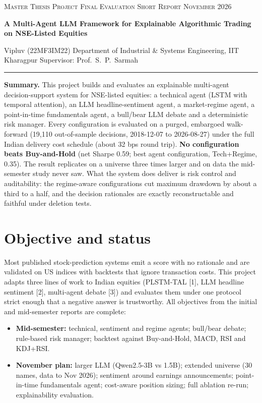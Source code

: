 \documentclass[10pt,a4paper]{article}
\begin{document}
{\small\textsc{Master Thesis Project \textperiodcentered{} Final Evaluation \textperiodcentered{} Short Report \textperiodcentered{} November 2026}}\par\vspace{4pt}
{\LARGE\bfseries A Multi-Agent LLM Framework for Explainable Algorithmic Trading on NSE-Listed Equities\par}\vspace{5pt}
Vipluv (22MF3IM22) \textperiodcentered{} Department of Industrial \& Systems Engineering, IIT Kharagpur \textperiodcentered{} Supervisor: Prof.\ S.\ P.\ Sarmah\par
\vspace{4pt}\hrule\vspace{6pt}

\textbf{Summary.} This project builds and evaluates an explainable multi-agent decision-support system for NSE-listed equities: a technical agent (LSTM with temporal attention), an LLM headline-sentiment agent, a market-regime agent, a point-in-time fundamentals agent, a bull/bear LLM debate and a deterministic risk manager. Every configuration is evaluated on a purged, embargoed walk-forward (19,110 out-of-sample decisions, 2018-12-07 to 2026-08-27) under the full Indian delivery cost schedule (about 32 bps round trip). \textbf{No configuration beats Buy-and-Hold} (net Sharpe 0.59; best agent configuration, Tech+Regime, 0.35). The result replicates on a universe three times larger and on data the mid-semester study never saw. What the system does deliver is risk control and auditability: the regime-aware configurations cut maximum drawdown by about a third to a half, and the decision rationales are exactly reconstructable and faithful under deletion tests.

\section{Objective and status}
Most published stock-prediction systems emit a score with no rationale and are validated on US indices with backtests that ignore transaction costs. This project adapts three lines of work to Indian equities (PLSTM-TAL [1], LLM headline sentiment [2], multi-agent debate [3]) and evaluates them under one protocol strict enough that a negative answer is trustworthy. All objectives from the initial and mid-semester reports are complete:
\begin{itemize}
\item \textbf{Mid-semester:} technical, sentiment and regime agents; bull/bear debate; rule-based risk manager; backtest against Buy-and-Hold, MACD, RSI and KDJ+RSI.
\item \textbf{November plan:} larger LLM (Qwen2.5-3B vs 1.5B); extended universe (30 names, data to Nov 2026); sentiment around earnings announcements; point-in-time fundamentals agent; cost-aware position sizing; full ablation re-run; explainability evaluation.
\end{itemize}
\end{document}
